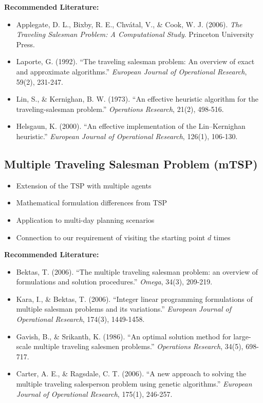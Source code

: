 \noindent\textbf{Recommended Literature:}
\begin{itemize}
    \item Applegate, D. L., Bixby, R. E., Chvátal, V., \& Cook, W. J. (2006). \textit{The Traveling Salesman Problem: A Computational Study}. Princeton University Press.
    \item Laporte, G. (1992). ``The traveling salesman problem: An overview of exact and approximate algorithms.'' \textit{European Journal of Operational Research}, 59(2), 231-247.
    \item Lin, S., \& Kernighan, B. W. (1973). ``An effective heuristic algorithm for the traveling-salesman problem.'' \textit{Operations Research}, 21(2), 498-516.
    \item Helsgaun, K. (2000). ``An effective implementation of the Lin–Kernighan heuristic.'' \textit{European Journal of Operational Research}, 126(1), 106-130.
\end{itemize}

\subsection{Multiple Traveling Salesman Problem (mTSP)}
\begin{itemize}
    \item Extension of the TSP with multiple agents
    \item Mathematical formulation differences from TSP
    \item Application to multi-day planning scenarios
    \item Connection to our requirement of visiting the starting point $d$ times
\end{itemize}

\noindent\textbf{Recommended Literature:}
\begin{itemize}
    \item Bektas, T. (2006). ``The multiple traveling salesman problem: an overview of formulations and solution procedures.'' \textit{Omega}, 34(3), 209-219.
    \item Kara, I., \& Bektas, T. (2006). ``Integer linear programming formulations of multiple salesman problems and its variations.'' \textit{European Journal of Operational Research}, 174(3), 1449-1458.
    \item Gavish, B., \& Srikanth, K. (1986). ``An optimal solution method for large-scale multiple traveling salesmen problems.'' \textit{Operations Research}, 34(5), 698-717.
    \item Carter, A. E., \& Ragsdale, C. T. (2006). ``A new approach to solving the multiple traveling salesperson problem using genetic algorithms.'' \textit{European Journal of Operational Research}, 175(1), 246-257.
\end{itemize}


